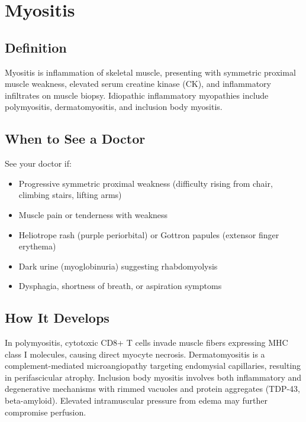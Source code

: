 \chapter{Myositis}

\section*{Definition}
Myositis is inflammation of skeletal muscle, presenting with symmetric proximal muscle weakness, elevated serum creatine kinase (CK), and inflammatory infiltrates on muscle biopsy. Idiopathic inflammatory myopathies include polymyositis, dermatomyositis, and inclusion body myositis.

\section*{When to See a Doctor}
See your doctor if:
\begin{itemize}
  \item Progressive symmetric proximal weakness (difficulty rising from chair, climbing stairs, lifting arms)
  \item Muscle pain or tenderness with weakness
  \item Heliotrope rash (purple periorbital) or Gottron papules (extensor finger erythema)
  \item Dark urine (myoglobinuria) suggesting rhabdomyolysis
  \item Dysphagia, shortness of breath, or aspiration symptoms
\end{itemize}

\section*{How It Develops}
In polymyositis, cytotoxic CD8+ T cells invade muscle fibers expressing MHC class I molecules, causing direct myocyte necrosis. Dermatomyositis is a complement-mediated microangiopathy targeting endomysial capillaries, resulting in perifascicular atrophy. Inclusion body myositis involves both inflammatory and degenerative mechanisms with rimmed vacuoles and protein aggregates (TDP-43, beta-amyloid). Elevated intramuscular pressure from edema may further compromise perfusion.

